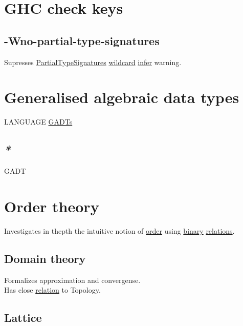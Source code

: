 \documentclass[a4paper,14pt,oneside]{book}
\begin{document}
\chapter{\label{org0e8be5a}GHC check keys}
\label{sec:org0dd834d}

\section{\label{orge90a11d}-Wno-partial-type-signatures}
\label{sec:org9b0ee4e}

Supresses \hyperref[org06d2fef]{PartialTypeSignatures} \hyperref[org73b62c3]{wildcard} \hyperref[orge15925f]{infer} warning.\\

\chapter{\label{org5b3f69e}Generalised algebraic data types}
\label{sec:org9200bc1}

LANGUAGE \hyperref[org533dc03]{GADTs}\\

\section{\emph{*}}
\label{sec:orgea81284}

\label{org2b2bffe}GADT\\

\chapter{\label{org593423d}Order theory}
\label{sec:org10e1a50}

Investigates in thepth the intuitive notion of \hyperref[orgd1a98a3]{order} using \hyperref[orga442c45]{binary} \hyperref[org2049f4a]{relations}.\\

\section{\label{orgdcbf882}Domain theory}
\label{sec:orgd72125a}

Formalizes approximation and convergense.\\
Has close \hyperref[org6396c35]{relation} to Topology.\\

\section{\label{orgefff109}Lattice}
\label{sec:orgbb29a59}
\end{document}
